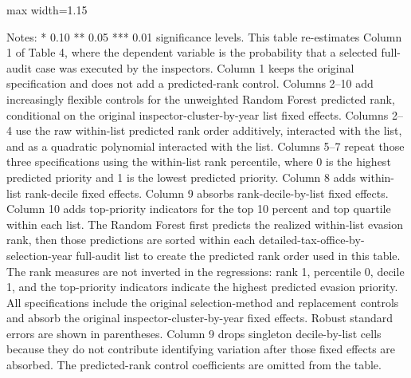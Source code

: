 \documentclass{article}
\newcommand{\OutPath}{Output/}%
\newcommand{\OutPath}{../Output/}%
\begin{document}
\begin{table}[H]\centering
\begin{adjustbox}{max width=1.15\textwidth}
\begin{threeparttable}
\caption{Table 4 Column 1 with Predicted-Rank Controls}
\label{tab:table4_col1_predicted_rank_control_comparison}
\footnotesize

\begin{tablenotes}[flushleft]
\footnotesize
\item Notes: * 0.10 ** 0.05 *** 0.01 significance levels. This table re-estimates Column 1 of Table 4, where the dependent variable is the probability that a selected full-audit case was executed by the inspectors. Column 1 keeps the original specification and does not add a predicted-rank control. Columns 2--10 add increasingly flexible controls for the unweighted Random Forest predicted rank, conditional on the original inspector-cluster-by-year list fixed effects. Columns 2--4 use the raw within-list predicted rank order additively, interacted with the list, and as a quadratic polynomial interacted with the list. Columns 5--7 repeat those three specifications using the within-list rank percentile, where 0 is the highest predicted priority and 1 is the lowest predicted priority. Column 8 adds within-list rank-decile fixed effects. Column 9 absorbs rank-decile-by-list fixed effects. Column 10 adds top-priority indicators for the top 10 percent and top quartile within each list. The Random Forest first predicts the realized within-list evasion rank, then those predictions are sorted within each detailed-tax-office-by-selection-year full-audit list to create the predicted rank order used in this table. The rank measures are not inverted in the regressions: rank 1, percentile 0, decile 1, and the top-priority indicators indicate the highest predicted evasion priority. All specifications include the original selection-method and replacement controls and absorb the original inspector-cluster-by-year fixed effects. Robust standard errors are shown in parentheses. Column 9 drops singleton decile-by-list cells because they do not contribute identifying variation after those fixed effects are absorbed. The predicted-rank control coefficients are omitted from the table.
\end{tablenotes}
\end{threeparttable}
\end{adjustbox}
\end{table}
\end{document}
